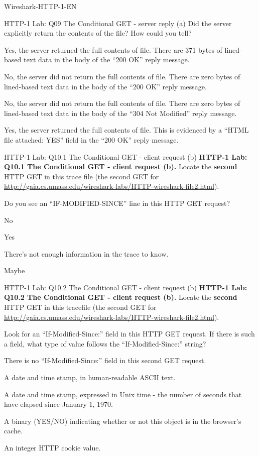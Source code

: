 \documentclass[a4paper]{article}
\begin{document}
\begin{quiz}{Wireshark-HTTP-1-EN}
\begin{multi}[points=1,shuffle]{HTTP-1 Lab: Q09 The Conditional GET - server reply (a)}
Did the server explicitly return the contents of the file? How could you tell? 
\item* Yes, the server returned the full contents of file. There are 371 bytes of lined-based text data in the body of the ``200 OK'' reply message.
\item No, the server did not return the full contents of file. There are zero bytes of lined-based text data in the body of the ``200 OK'' reply message.
\item No, the server did not return the full contents of file. There are zero bytes of lined-based text data in the body of the ``304 Not Modified'' reply message.
\item Yes, the server returned the full contents of file. This is evidenced by a ``HTML file attached: YES'' field in the ``200 OK'' reply message.
\end{multi}

\begin{multi}[points=1,shuffle]{HTTP-1 Lab: Q10.1 The Conditional GET - client request (b)}
\textbf{HTTP-1 Lab: Q10.1 The Conditional GET - client request (b).} Locate the \textbf{second} HTTP GET in this trace file (the second GET for \href{http://gaia.cs.umass.edu/wireshark-labs/HTTP-wireshark-file2.html}{http://gaia.cs.umass.edu/wireshark-labs/HTTP-wireshark-file2.html}).

Do you see an ``IF-MODIFIED-SINCE'' line in this HTTP GET request? 
\item No
\item* Yes
\item There's not enough information in the trace to know.
\item Maybe
\end{multi}

\begin{multi}[points=1,shuffle]{HTTP-1 Lab: Q10.2 The Conditional GET - client request (b)}
\textbf{HTTP-1 Lab: Q10.2 The Conditional GET - client request (b).} Locate the \textbf{second} HTTP GET in this tracefile (the second GET for \href{http://gaia.cs.umass.edu/wireshark-labs/HTTP-wireshark-file2.html}{http://gaia.cs.umass.edu/wireshark-labs/HTTP-wireshark-file2.html}).

Look for an ``If-Modified-Since:'' field in this HTTP GET request.  If there is such a field, what type of value follows the ``If-Modified-Since:'' string? 
\item There is no ``If-Modified-Since:'' field in this second GET request.
\item* A date and time stamp, in human-readable ASCII text.
\item A date and time stamp, expressed in Unix time - the number of seconds that have elapsed since January 1, 1970.
\item A binary (YES/NO) indicating whether or not this object is in the browser's cache.
\item An integer HTTP cookie value.
\end{multi}


\end{quiz}
\end{document}
